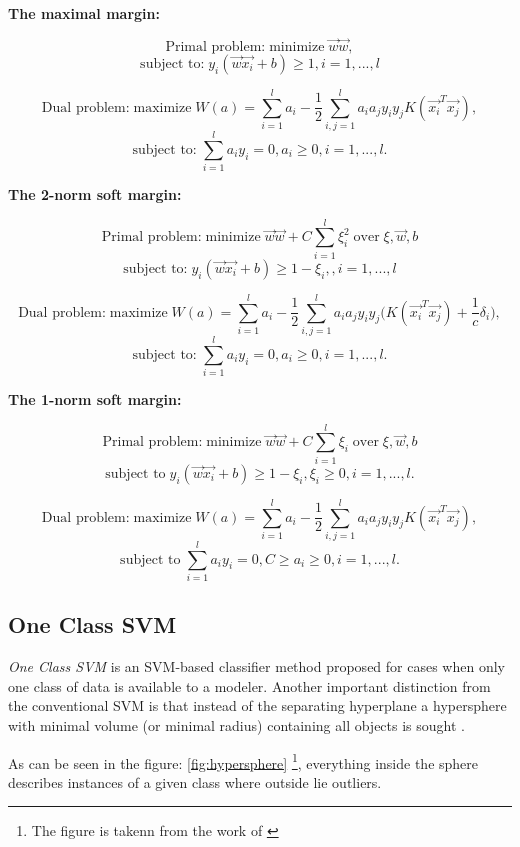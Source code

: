 \textbf{The maximal margin:}

\[\textrm{Primal problem:}\; \textrm{minimize}\; \vec{w} \vec{w},\] \[\textrm{subject to:}\; y_i(\vec{w}\vec{x_i} + b) \geq 1, i = 1, ...,l \] 

\[\textrm{Dual problem:}\; \textrm{maximize}\; W(a) =  \sum_{i=1}^{l} a_i - \frac{1}{2}\sum_{i,j = 1}^{l}a_i a_j y_i y_j K(\vec{x_i}^T \vec{x_j}), \] 
\[\textrm{subject to:}\; \sum_{i=1}^{l}a_i y_i = 0, a_i \geq 0, i = 1,...,l.\] 

\textbf{The 2-norm soft margin:}

\[\textrm{Primal problem:}\; \textrm{minimize}\; \vec{w} \vec{w} + C \sum_{i=1}^{l} \xi^2_i\; \textrm{over}\; \xi,\vec{w},b\] 
\[\textrm{subject to:}\; y_i(\vec{w}\vec{x_i} + b) \geq 1 - \xi_i,, i = 1, ...,l \] 

\[\textrm{Dual problem:}\; \textrm{maximize}\; W(a) =  \sum_{i=1}^{l} a_i - \frac{1}{2}\sum_{i,j = 1}^{l}a_i a_j y_i y_j \Big( K(\vec{x_i}^T \vec{x_j}) + \frac{1}{c}\delta_i \Big), \] 
\[\textrm{subject to:}\; \sum_{i=1}^{l}a_i y_i = 0, a_i \geq 0, i = 1,...,l.\] 

\textbf{The 1-norm soft margin:}

\[\textrm{Primal problem:}\; \textrm{minimize}\; \vec{w} \vec{w} + C \sum_{i=1}^{l} \xi_i\; \textrm{over}\; \xi,\vec{w},b\] 
\[\textrm{subject to}\; y_i(\vec{w}\vec{x_i} + b) \geq 1 - \xi_i,\xi_i \geq 0, i = 1, ...,l.\] 

\[\textrm{Dual problem:}\; \textrm{maximize}\; W(a) =  \sum_{i=1}^{l} a_i - \frac{1}{2}\sum_{i,j = 1}^{l}a_i a_j y_i y_j K(\vec{x_i}^T \vec{x_j}) , \]
\[\textrm{subject to}\; \sum_{i=1}^{l}a_i y_i = 0,C \geq a_i \geq 0, i = 1,...,l.\] 

\subsection{One Class SVM}\label{Chapter:OC-SVM}
\textit{One Class SVM} is an SVM-based classifier method proposed for cases when only one class of data is available to a modeler. Another important distinction from the conventional SVM is that instead of the separating hyperplane a hypersphere with minimal volume (or
minimal radius) containing all objects is sought \cite{Tax:2004:SVD:960091.960109}. 

As can be seen in the figure: \ref{fig:hypersphere} \footnote{The figure is takenn from the work of  \cite{s120810109}}, everything inside the sphere describes instances of a given class where outside lie outliers. 


